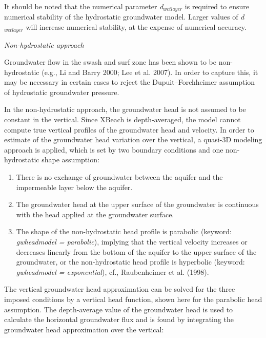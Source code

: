 \documentclass{article}
\begin{document}
\noindent 

\noindent It should be noted that the numerical parameter \textit{d${}_{wetlayer}$} is required to ensure numerical stability of the hydrostatic groundwater model. Larger values of \textit{d${}_{wetlayer}$} will increase numerical stability, at the expense of numerical accuracy. 

\noindent 

\noindent \textit{Non-hydrostatic approach}

\noindent Groundwater flow in the swash and surf zone has been shown to be non-hydrostatic (e.g., Li and Barry 2000; Lee et al. 2007). In order to capture this, it may be necessary in certain cases to reject the Dupuit--Forchheimer assumption of hydrostatic groundwater pressure. 

\noindent \textit{}

\noindent In the non-hydrostatic approach, the groundwater head is not assumed to be constant in the vertical. Since XBeach is depth-averaged, the model cannot compute true vertical profiles of the groundwater head and velocity. In order to estimate of the groundwater head variation over the vertical, a quasi-3D modeling approach is applied, which is set by two boundary conditions and one non-hydrostatic shape assumption:

\noindent 

\begin{enumerate}
\item  There is no exchange of groundwater between the aquifer and the impermeable layer below the aquifer.

\item  The groundwater head at the upper surface of the groundwater is continuous with the head applied at the groundwater surface.

\item  The shape of the non-hydrostatic head profile is parabolic (keyword: \textit{gwheadmodel = parabolic}), implying that the vertical velocity increases or decreases linearly from the bottom of the aquifer to the upper surface of the groundwater, or the non-hydrostatic head profile is hyperbolic (keyword: \textit{gwheadmodel = exponential}), cf., Raubenheimer et al. (1998).
\end{enumerate}

\noindent 

\noindent The vertical groundwater head approximation can be solved for the three imposed conditions by a vertical head function, shown here for the parabolic head assumption. The depth-average value of the groundwater head is used to calculate the horizontal groundwater flux and is found by integrating the groundwater head approximation over the vertical:
\end{document}
